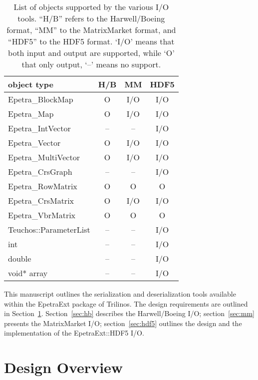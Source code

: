 \documentclass[11pt,relax]{SANDreport}
\begin{document}
\begin{table}
\begin{center}
\begin{tabular}{|l | c | c | c |}
\hline
object type           & H/B       & MM        & HDF5 \\
\hline
Epetra\_BlockMap      & O  & I/O & I/O \\
Epetra\_Map           & O  & I/O & I/O \\
Epetra\_IntVector     & -- & --  & I/O \\
Epetra\_Vector        & O  & I/O & I/O \\
Epetra\_MultiVector   & O  & I/O & I/O \\
Epetra\_CrsGraph      & -- & --  & I/O \\
Epetra\_RowMatrix     & O  &   O &   O \\
Epetra\_CrsMatrix     & O  & I/O & I/O \\
Epetra\_VbrMatrix     & O  &   O &   O \\
Teuchos::ParameterList& -- & --  & I/O \\
int                   & -- & --  & I/O \\
double                & -- & --  & I/O \\
void* array           & -- & --  & I/O \\
\hline
\end{tabular}
\caption{List of objects supported by the various I/O tools. ``H/B'' refers to
  the Harwell/Boeing format, ``MM'' to the MatrixMarket format, and ``HDF5''
    to the HDF5 format. `I/O' means that both input and output are supported,
       while `O' that only output, `--' means no support.}
\label{tab:supported}
\end{center}
\end{table}

\smallskip

This manuscript outlines the serialization and deserialization tools available
within the EpetraExt package of Trilinos. The design requirements are outlined
in Section~\ref{sec:design}.
Section~\ref{sec:hb} describes the
Harwell/Boeing I/O; section~\ref{sec:mm} presents the MatrixMarket I/O;
section~\ref{sec:hdf5} outlines the design and the implementation of the
EpetraExt::HDF5 I/O. 

\section{Design Overview}
\label{sec:design}
\end{document}

